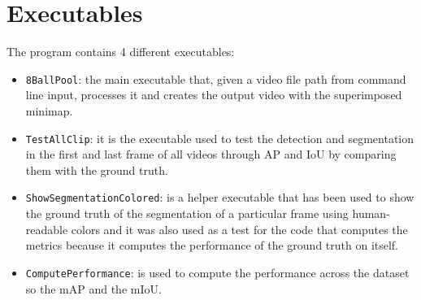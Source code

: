 \section{Executables}
The program contains 4 different executables:
\begin{itemize}
	\item \texttt{8BallPool}: the main executable that, given a video file path from command line input, processes it and creates the output video with the superimposed minimap.
	\item \texttt{TestAllClip}: it is the executable used to test the detection and segmentation in the first and last frame of all videos through AP and IoU by comparing them with the ground truth.
	\item \texttt{ShowSegmentationColored}: is a helper executable that has been used to show the ground truth of the segmentation of a particular frame using human-readable colors and it was also used as a test for the code that computes the metrics because it computes the performance of the ground truth on itself.
	\item \texttt{ComputePerformance}: is used to compute the performance across the dataset so the mAP and the mIoU.
\end{itemize}


